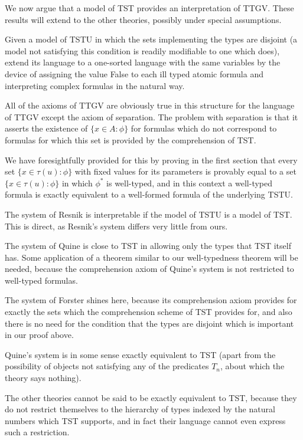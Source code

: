 \documentclass[12pt]{article}
\begin{document}
We now argue that a model of TST provides an interpretation of TTGV.  These results will extend
to the other theories, possibly under special assumptions.

Given a model of TSTU in which the sets implementing the types are disjoint (a model not satisfying this condition is readily modifiable to one which does), extend its language to a one-sorted language with the same variables
by the device of assigning the value False to each ill typed atomic formula and interpreting complex formulas in the natural way.

All of the axioms of TTGV are obviously true in this structure for the language of TTGV except the axiom of separation.  The problem with separation is that it asserts the existence of $\{x \in A:\phi\}$ for formulas
which do not correspond to formulas for which this set is provided by the comprehension of TST.

We have foresightfully provided for this by proving in the first section that every set $\{x \in \tau(u):\phi\}$ with fixed values for its parameters is provably equal to a set $\{x \in \tau(u):\phi\}$ in which $\phi^*$ is well-typed, and in this context a well-typed formula is exactly equivalent to a well-formed formula of the underlying TSTU.

The system of Resnik is interpretable if the model of TSTU is a model of TST.  This is direct, as Resnik's system differs very little from ours.

The system of Quine is close to TST in allowing only the types that TST itself has.  Some application of a theorem similar to our well-typedness theorem will be needed, because the comprehension axiom of Quine's system is not restricted to well-typed formulas.

The system of Forster shines here, because its comprehension axiom provides for exactly the sets which the comprehension scheme of TST provides for, and also there is no need for the condition that the types are disjoint which is important in our proof above.

Quine's system is in some sense exactly equivalent to TST (apart from the possibility of objects not satisfying any of the predicates $T_n$, about which the theory says nothing).

The other theories cannot be said to be exactly equivalent to TST, because they do not restrict themselves to the hierarchy of types indexed by the natural numbers which TST supports, and in fact their language cannot even express such a restriction.
\end{document}
